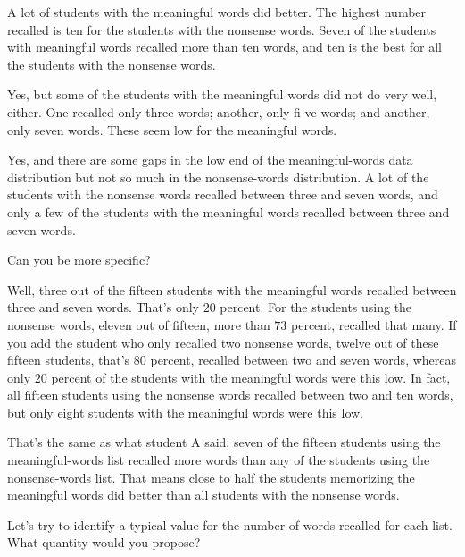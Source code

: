 {\begin{scriptlist}
      \item [Student A:] A lot of students with the meaningful words did better. The highest number recalled is ten for the students with the nonsense words. Seven of the students with meaningful words recalled more than ten words, and ten is the best for all the students with the nonsense words.
  
      \item [Student B:] Yes, but some of the students with the meaningful words did not do very well, either. One recalled only three words; another, only fi ve words; and another, only seven words. These seem low for the meaningful words.
      
      \item [Student C:] Yes, and there are some gaps in the low end of the meaningful-words data distribution but not so much in the nonsense-words distribution. A lot of the students with the nonsense words recalled between three and seven words, and only a few of the students with the meaningful words recalled between three and seven words.
      
      \item [Teacher:] Can you be more specific?\vspace{\baselineskip}
      
      \item [Student C:] Well, three out of the fifteen students with the meaningful words recalled between three and seven words. That's only $20$ percent. For the students using the nonsense words, eleven out of fifteen, more than $73$ percent, recalled that many. If you add the student who only recalled two nonsense words, twelve out of these fifteen students, that's $80$ percent, recalled between two and seven words, whereas only $20$ percent of the students with the meaningful words were this low. In fact, all fifteen students using the nonsense words recalled between two and ten words, but only eight students with the meaningful words were this low. 
  
      \item [Teacher:] That's the same as what student A said, seven of the fifteen students using the meaningful-words list recalled more words than any of the students using the nonsense-words list. That means close to half the students memorizing the meaningful words did better than all students with the nonsense words.
      
      \item [Teacher:] Let's try to identify a typical value for the number of words recalled for each list. What quantity would you propose?
      

\end{scriptlist}}
